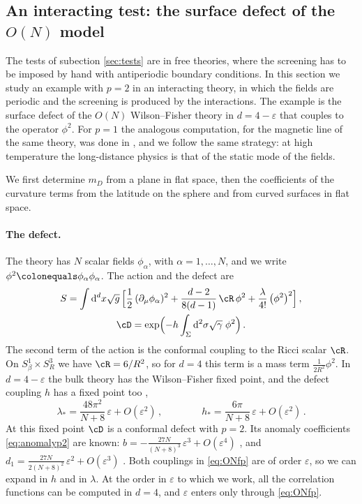 \documentclass[a4paper,11pt]{article}
\newcommand{\dd}{\mathrm{d}}
\begin{document}
\subsection{An interacting test: the surface defect of the \texorpdfstring{$O(N)$}{O(N)} model}\label{sec:ON}

The tests of subection \ref{sec:tests} are in free theories, where the screening has to be imposed by hand with antiperiodic boundary conditions. In this section we study an example with $p=2$ in an interacting theory, in which the fields are periodic and the screening is produced by the interactions. The example is the surface defect of the $O(N)$ Wilson--Fisher theory in $d=4-\varepsilon$ that couples to the operator $\phi^2$. For $p=1$ the analogous computation, for the magnetic line of the same theory, was done in \cite{BMP}, and we follow the same strategy: at high temperature the long-distance physics is that of the static mode of the fields.

We first determine $m_D$ from a plane in flat space, then the coefficients of the curvature terms from the latitude on the sphere and from curved surfaces in flat space.

\paragraph{The defect.}
The theory has $N$ scalar fields $\phi_\alpha$, with $\alpha=1,\dots,N$, and we write $\phi^2\colonequals\phi_\alpha\phi_\alpha$. The action and the defect are
\begin{equation}\label{eq:ONaction}
	\begin{gathered}
		S=\int\dd^dx\sqrt g\,\Bigl[\frac12\,(\partial_\mu\phi_\alpha)^2+\frac{d-2}{8(d-1)}\,\cR\,\phi^2+\frac{\lambda}{4!}\,\bigl(\phi^2\bigr)^2\Bigr]\, ,\\
		\cD=\exp\Bigl(-h\int_\Sigma\dd^2\sigma\sqrt\gamma\;\phi^2\Bigr)\, .
	\end{gathered}
\end{equation}
The second term of the action is the conformal coupling to the Ricci scalar $\cR$. On $S^1_\beta\times S^{3}_R$ we have $\cR=6/R^2$, so for $d=4$ this term is a mass term $\tfrac{1}{2R^2}\phi^2$. In $d=4-\varepsilon$ the bulk theory has the Wilson--Fisher fixed point, and the defect coupling $h$ has a fixed point too \cite{Trepanier:2023tvb,Giombi:2023dqs,Raviv-Moshe:2023yvq,Shachar:2022fqk},
\begin{equation}\label{eq:ONfp}
	\lambda_*=\frac{48\pi^2}{N+8}\,\varepsilon+O(\varepsilon^2)\, ,\qquad\qquad h_*=\frac{6\pi}{N+8}\,\varepsilon+O(\varepsilon^2)\, .
\end{equation}
At this fixed point $\cD$ is a conformal defect with $p=2$. Its anomaly coefficients \eqref{eq:anomalyp2} are known: $b=-\tfrac{27N}{(N+8)^3}\,\varepsilon^3+O(\varepsilon^4)$ \cite{Giombi:2023dqs}, and $d_1=\tfrac{27N}{2(N+8)^2}\,\varepsilon^2+O(\varepsilon^3)$ \cite{Diatlyk:2024ngd}. Both couplings in \eqref{eq:ONfp} are of order $\varepsilon$, so we can expand in $h$ and in $\lambda$. At the order in $\varepsilon$ to which we work, all the correlation functions can be computed in $d=4$, and $\varepsilon$ enters only through \eqref{eq:ONfp}.
\end{document}
